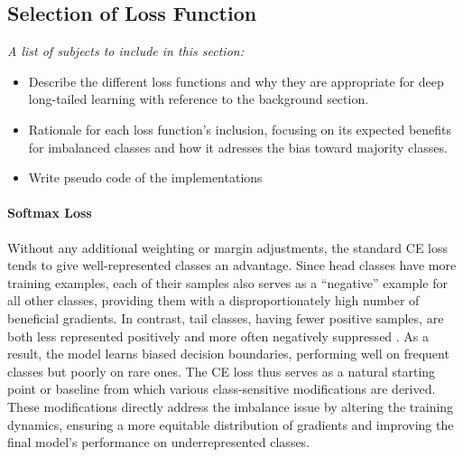 \subsection{Selection of Loss Function}
\textit{A list of subjects to include in this section:}

 \begin{itemize}
    \item Describe the different loss functions and why they are appropriate for deep long-tailed learning with reference to the background section.
    \item Rationale for each loss function's inclusion, focusing on its expected benefits for imbalanced classes and how it adresses the bias toward majority classes.
    \item Write pseudo code of the implementations
 \end{itemize}

 \paragraph{Softmax Loss}
 Without any additional weighting or margin adjustments, the standard CE loss tends to give well-represented classes an advantage. Since head classes have more training examples, each of their samples also serves as a “negative” example for all other classes, providing them with a disproportionately high number of beneficial gradients. In contrast, tail classes, having fewer positive samples, are both less represented positively and more often negatively suppressed \cite{zhang2023deep, lin2018focallossdenseobject}. As a result, the model learns biased decision boundaries, performing well on frequent classes but poorly on rare ones. The CE loss thus serves as a natural starting point or baseline from which various class-sensitive modifications are derived. These modifications directly address the imbalance issue by altering the training dynamics, ensuring a more equitable distribution of gradients and improving the final model’s performance on underrepresented classes.

